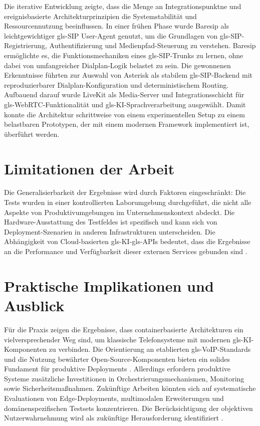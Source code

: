 Die iterative Entwicklung zeigte, dass die Menge an Integrationspunktne und ereignisbasierte Architekturprinzipien die Systemstabilität und Ressourcennutzung beeinflussen. In einer frühen Phase wurde Baresip als leichtgewichtiger \gls{gls-SIP} User-Agent genutzt, um die Grundlagen von \gls{gls-SIP}-Registrierung, Authentifizierung und Medienpfad-Steuerung zu verstehen. Baresip ermöglichte es, die Funktionsmechaniken eines \gls{gls-SIP}-Trunks zu lernen, ohne dabei von umfangreicher Dialplan-Logik belastet zu sein. Die gewonnenen Erkenntnisse führten zur Auswahl von Asterisk als stabilem \gls{gls-SIP}-Backend mit reproduzierbarer Dialplan-Konfiguration und deterministischem Routing. Aufbauend darauf wurde LiveKit als Media-Server und Integrationsschicht für \gls{gls-WebRTC}-Funktionalität und \gls{gls-KI}-Sprachverarbeitung ausgewählt. Damit konnte die Architektur schrittweise von einem experimentellen Setup zu einem belastbaren Prototypen, der mit einem modernen Framework implementiert ist, überführt werden.

\section{Limitationen der Arbeit}

Die Generalisierbarkeit der Ergebnisse wird durch Faktoren eingeschränkt: Die Tests wurden in einer kontrollierten Laborumgebung durchgeführt, die nicht alle Aspekte von Produktivumgebungen im Unternehmenskontext abdeckt. Die Hardware-Ausstattung des Testfeldes ist spezifisch und kann sich von Deployment-Szenarien in anderen Infrastrukturen unterscheiden. Die Abhängigkeit von Cloud-basierten \gls{gls-KI}-\gls{gls-API}s bedeutet, dass die Ergebnisse an die Performance und Verfügbarkeit dieser externen Services gebunden sind \parencite{ReliabilityVirtualizedNetworks,ITU-T-G114}.

\section{Praktische Implikationen und Ausblick}

Für die Praxis zeigen die Ergebnisse, dass containerbasierte Architekturen ein vielversprechender Weg sind, um klassische Telefonsysteme mit modernen \gls{gls-KI}-Komponenten zu verbinden. Die Orientierung an etablierten \gls{gls-VoIP}-Standards und die Nutzung bewährter Open-Source-Komponenten bieten ein solides Fundament für produktive Deployments \parencite{Antonova2025}. Allerdings erfordern produktive Systeme zusätzliche Investitionen in Orchestrierungsmechanismen, Monitoring sowie Sicherheitsma\ss nahmen. Zukünftige Arbeiten könnten sich auf systematische Evaluationen von Edge-Deployments, multimodalen Erweiterungen und domänenspezifischen Testsets konzentrieren. Die Berücksichtigung der objektiven Nutzerwahrnehmung wird als zukünftige Herausforderung identifiziert \parencite{ITU-T-G114}.

